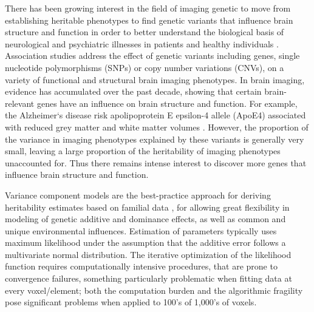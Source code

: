 There has been growing interest in the field of imaging genetic to move from establishing heritable phenotypes to find genetic variants that influence brain structure and function in order  to better understand the biological basis of neurological and psychiatric illnesses in patients and healthy individuals \citep{Hibar2015,Stein2012,Stein2010a,Stein2010b,Potkin2009a,Potkin2009b}. Association studies address the effect of genetic variants including genes, single nucleotide polymorphisms (SNPs) or copy number variations (CNVs), on a variety of functional and structural brain imaging phenotypes. In brain imaging, evidence has accumulated over the past decade, showing that certain brain-relevant genes have an influence on brain structure and function.  For example, the Alzheimer‘s disease risk apolipoprotein E epsilon-4 allele (ApoE4) associated with reduced grey matter \citep{Burggren2008,Pievani2009} and white matter volumes \citep{Hua2008}.  However, the proportion of the variance in imaging phenotypes explained by these variants is generally very small, leaving a large proportion of the heritability of imaging phenotypes unaccounted for. Thus there remains intense interest to discover more genes that influence brain structure and function. 
 
 
 
Variance component models are the best-practice approach for deriving  heritability estimates based on familial data \citep{Almasy1998,Blangero1997,Amos1994,HOPPER1983}, for allowing great flexibility in modeling of genetic additive and dominance effects, as well as common and unique environmental influences.  Estimation of parameters typically uses maximum likelihood under the assumption that the additive error follows a multivariate normal distribution. The iterative optimization of the likelihood function requires computationally intensive procedures, that are  prone to convergence failures, something  particularly problematic when fitting data at every voxel/element; both the computation burden and the algorithmic fragility pose significant problems when applied to 100's of 1,000's of voxels. 

